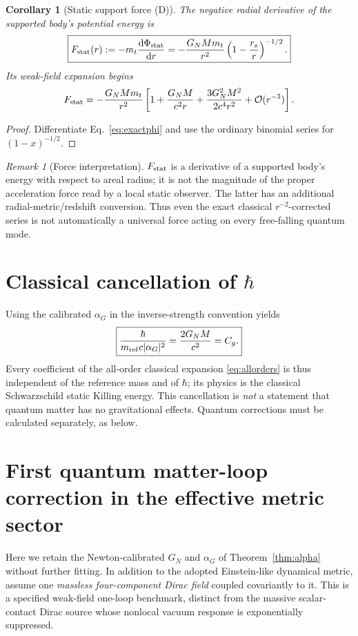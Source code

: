 \documentclass[11pt,a4paper]{article}
\newtheorem{corollary}[theorem]{Corollary}
\theoremstyle{remark}
\newtheorem{remark}[theorem]{Remark}
\newcommand{\dd}{\mathrm d}
\newcommand{\Ord}{\mathcal O}
\newcommand{\eref}[1]{Eq.~\eqref{#1}}
\begin{document}
\begin{corollary}[Static support force (D)]\label{cor:force}
The negative radial derivative of the supported body's potential energy is
\begin{equation}\label{eq:fstat}
\boxed{F_{\rm stat}(r):=-m_t\frac{\dd\Phi_{\rm stat}}{\dd r}
=-\frac{G_NMm_t}{r^2}\left(1-\frac{r_s}{r}\right)^{-1/2}.}
\end{equation}
Its weak-field expansion begins
\begin{equation}\label{eq:fstatseries}
F_{\rm stat}=-\frac{G_NMm_t}{r^2}\left[1+\frac{G_NM}{c^2r}
+\frac{3G_N^2M^2}{2c^4r^2}+\Ord(r^{-3})\right].
\end{equation}
\end{corollary}
\begin{proof}
Differentiate \eref{eq:exactphi} and use the ordinary binomial series for $(1-x)^{-1/2}$.
\end{proof}
\begin{remark}[Force interpretation]
$F_{\rm stat}$ is a derivative of a supported body's energy with respect to areal radius; it is not the magnitude of the proper acceleration force read by a local static observer. The latter has an additional radial-metric/redshift conversion. Thus even the exact classical $r^{-2}$-corrected series is not automatically a universal force acting on every free-falling quantum mode.
\end{remark}

\section{Classical cancellation of \texorpdfstring{$\hbar$}{hbar}}\label{sec:hbar}
Using the calibrated $\alpha_G$ in the inverse-strength convention yields
\begin{equation}\label{eq:hcancellation}
\boxed{\frac{\hbar}{m_{\rm ref}c|\alpha_G|^2}
=\frac{2G_NM}{c^2}=C_g.}
\end{equation}
Every coefficient of the all-order classical expansion \eqref{eq:allorders}
is thus independent of the reference mass and of $\hbar$; its physics is
the classical Schwarzschild static Killing energy. This cancellation is
\emph{not} a statement that quantum matter has no gravitational effects.
Quantum corrections must be calculated separately, as below.

\section{First quantum matter-loop correction in the effective metric sector}\label{sec:qloop}
Here we retain the Newton-calibrated $G_N$ and $\alpha_G$ of
Theorem~\ref{thm:alpha} without further fitting. In addition to the adopted
Einstein-like dynamical metric, assume one \emph{massless four-component
Dirac field} coupled covariantly to it. This is a specified weak-field
one-loop benchmark, distinct from the massive scalar-contact Dirac source
whose nonlocal vacuum response is exponentially suppressed.
\end{document}
